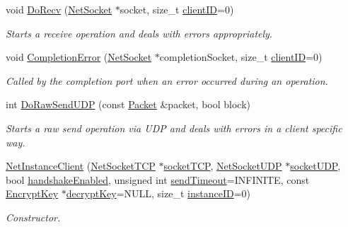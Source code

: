 \begin{DoxyCompactItemize}
void \hyperlink{class_net_instance_client_a92a62257550ff1d2d4db8b47ed55e8b7}{DoRecv} (\hyperlink{class_net_socket}{NetSocket} $\ast$socket, size\_\-t \hyperlink{class_net_instance_client_abc188a88da7ab851bc3ac4d9287fe342}{clientID}=0)
\begin{DoxyCompactList}\small\item\em Starts a receive operation and deals with errors appropriately. \item\end{DoxyCompactList}\item 
void \hyperlink{class_net_instance_client_a81244ebf13908fd198a79de50afc6a2a}{CompletionError} (\hyperlink{class_net_socket}{NetSocket} $\ast$completionSocket, size\_\-t \hyperlink{class_net_instance_client_abc188a88da7ab851bc3ac4d9287fe342}{clientID}=0)
\begin{DoxyCompactList}\small\item\em Called by the completion port when an error occurred during an operation. \item\end{DoxyCompactList}\item 
int \hyperlink{class_net_instance_client_a44604d72abe620f617bf26c7fe497e70}{DoRawSendUDP} (const \hyperlink{class_packet}{Packet} \&packet, bool block)
\begin{DoxyCompactList}\small\item\em Starts a raw send operation via UDP and deals with errors in a client specific way. \item\end{DoxyCompactList}\item 
\hyperlink{class_net_instance_client_a66e97eb71dc131728b526d911a3b8548}{NetInstanceClient} (\hyperlink{class_net_socket_t_c_p}{NetSocketTCP} $\ast$\hyperlink{class_net_instance_implemented_t_c_p_adb7cac7d6ca26729e2eb83ae7f6ad984}{socketTCP}, \hyperlink{class_net_socket_u_d_p}{NetSocketUDP} $\ast$\hyperlink{class_net_instance_u_d_p_af86e8343ddf2daf0ce3f9ea701bc7cf3}{socketUDP}, bool \hyperlink{class_net_instance_t_c_p_af13f96901d3006beeda0c161f32cbfde}{handshakeEnabled}, unsigned int \hyperlink{class_net_instance_a39ed2f4325ce50a7c374ab6253650608}{sendTimeout}=INFINITE, const \hyperlink{class_encrypt_key}{EncryptKey} $\ast$\hyperlink{class_net_instance_client_abfd45e00771b132f08c2aea9bf582a3e}{decryptKey}=NULL, size\_\-t \hyperlink{class_net_instance_a46bab6fc672f987ee3c52daabffe34f7}{instanceID}=0)
\begin{DoxyCompactList}\small\item\em Constructor. \item\end{DoxyCompactList}\item 

\end{DoxyCompactItemize}
